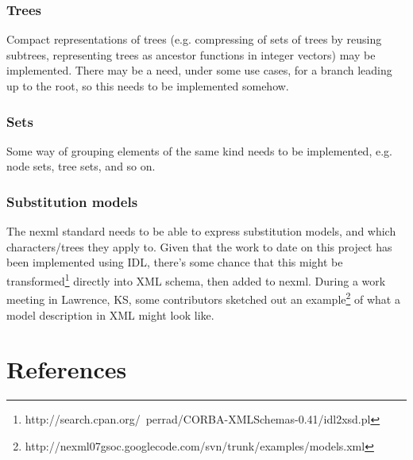 \documentclass{article}
\begin{document}
\subsubsection{Trees}
Compact representations of trees (e.g. compressing of sets of trees by reusing subtrees, representing trees as ancestor functions in integer vectors) may be implemented. There may be a need, under some use cases, for a branch leading up to the root, so this needs to be implemented somehow.

\subsubsection{Sets}
Some way of grouping elements of the same kind needs to be implemented, e.g. node sets, tree sets, and so on.

\subsubsection{Substitution models}
The nexml standard needs to be able to express substitution models, and which characters/trees they apply to. Given that 
the work to date on this project has been implemented using IDL, there's some chance that 
this might be transformed\footnote{http://search.cpan.org/~perrad/CORBA-XMLSchemas-0.41/idl2xsd.pl} directly into XML schema, 
then added to nexml. During a work meeting in Lawrence, KS, some contributors sketched out an 
example\footnote{http://nexml07gsoc.googlecode.com/svn/trunk/examples/models.xml} of what a model description in XML might look like.

\section{References}


\end{document}
